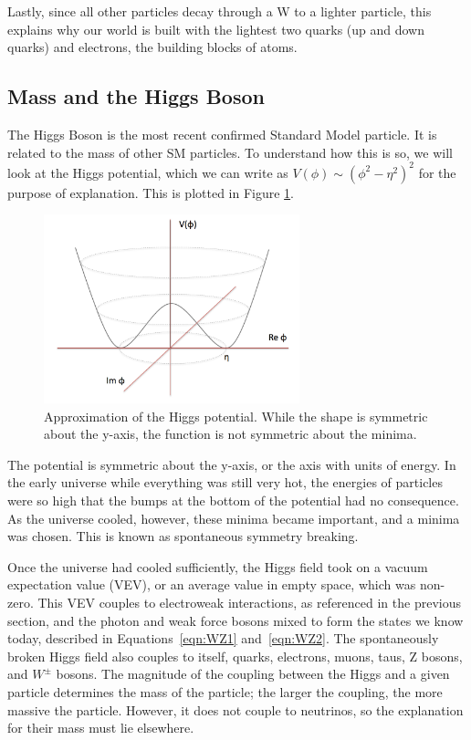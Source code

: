 Lastly, since all other particles decay through a W to a lighter particle, this explains why our world is built with the lightest two quarks (up and down quarks) and electrons, the building blocks of atoms. 

\subsection{Mass and the Higgs Boson}
The Higgs Boson is the most recent confirmed Standard Model particle. It is related to the mass of other SM particles. To understand how this is so, we will look at the Higgs potential, which we can write as $V(\phi) \sim (\phi^2 - \eta^2)^2$ for the purpose of explanation. This is plotted in Figure \ref{Fig:Intro:HiggsPot}.
\begin{figure}[h]
    \centering
        \includegraphics[width=0.66\textwidth]{F1/higgspot.png}
        \caption{Approximation of the Higgs potential. While the shape is symmetric about the y-axis, the function is not symmetric about the minima.}
        \label{Fig:Intro:HiggsPot}
\end{figure}
The potential is symmetric about the y-axis, or the axis with units of energy. In the early universe while everything was still very hot, the energies of particles were so high that the bumps at the bottom of the potential had no consequence. As the universe cooled, however, these minima became important, and a minima was chosen. This is known as spontaneous symmetry breaking.

Once the universe had cooled sufficiently, the Higgs field took on a vacuum expectation value (VEV), or an average value in empty space, which was non-zero. This VEV couples to electroweak interactions, as referenced in the previous section, and the photon and weak force bosons mixed to form the states we know today, described in Equations~\ref{eqn:WZ1} and~\ref{eqn:WZ2}. The spontaneously broken Higgs field also couples to itself, quarks, electrons, muons, taus, Z bosons, and $W^{\pm}$ bosons. The magnitude of the coupling between the Higgs and a given particle determines the mass of the particle; the larger the coupling, the more massive the particle. However, it does not couple to neutrinos, so the explanation for their mass must lie elsewhere.

